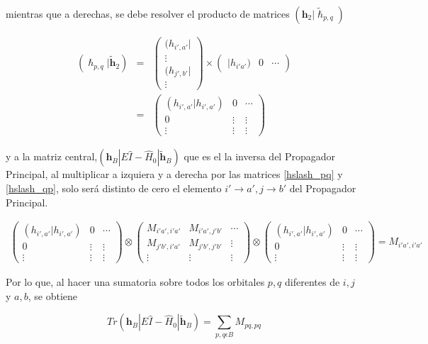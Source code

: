 \documentclass{beamer}
\begin{document}
\begin{frame}
  mientras que a derechas, se debe resolver el producto de matrices 
$( \bm{h}_2 | \widetilde{\bm{\hslash}}_{p,q})$

\begin{eqnarray*}\label{hslash_pq}
	( \bm{\hslash}_{p,q} | \bm{\widetilde{h}}_2 )
		 &=& \begin{pmatrix}
		(h_{i',a'}| \\
		 \vdots \\
		(h_{j',b'}| \\
		
		\vdots 
	\end{pmatrix}  \times  \begin{pmatrix}
		|h_{i'a'}) & 0 &  \cdots
	\end{pmatrix}            \\
     & = & \begin{pmatrix}
		 (h_{i',a'} | h_{i',a'}) & 0 & \cdots \\
		 0 & \vdots & \vdots \\
		 \vdots & \vdots & \vdots 
	 \end{pmatrix} 
\end{eqnarray*}

\end{frame}
\begin{frame}
  y a la matriz central,$(\bm{h}_B| E \hat{I} - \hat{H}_0 | \bm{\widetilde{h}}_B )$ 
que es el la inversa del Propagador Principal, al multiplicar a izquiera y a derecha por las matrices \ref{hslash_pq} y \ref{hslash_qp},
solo será distinto de cero el elemento $i'\rightarrow a', j \rightarrow b'$ del Propagador Principal. 

\begin{eqnarray*}
	\begin{pmatrix}
		(h_{i',a'} | h_{i',a'}) & 0 & \cdots \\
		0 & \vdots & \vdots \\
		\vdots & \vdots & \vdots 
	\end{pmatrix} \otimes \begin{pmatrix}
		M_{i'a',i'a'} & M_{i'a',j' b'} &  \cdots \\
		M_{j' b',i'a'} & M_{j' b',j' b'} & \vdots \\
		\vdots & \vdots & \vdots
	\end{pmatrix} \otimes
	\begin{pmatrix}
		(h_{i',a'} | h_{i',a'}) & 0 & \cdots \\
		0 & \vdots & \vdots \\
		\vdots & \vdots & \vdots 
	\end{pmatrix} = M_{i'a',i'a'}
	\end{eqnarray*}

Por lo que, al hacer una sumatoria sobre todos los orbitales $p,q$ diferentes de $i,j$ y $a,b$, se obtiene

\begin{equation*}
	Tr (\bm{h}_B| E \hat{I} - \hat{H}_0 | \bm{\widetilde{h}}_B)  =  \sum_{p,q  \epsilon B} M_{pq,pq}
\end{equation*}
\end{frame}
\end{document}
